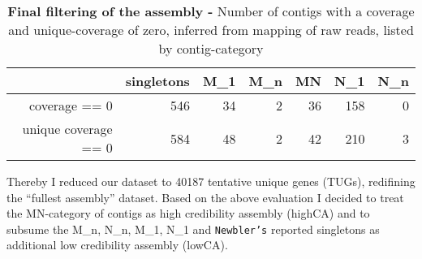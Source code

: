 \begin{table}[ht]
\begin{center}
\begin{tabular}{rrrrrrr}
  \hline
 & singletons & M\_1 & M\_n & MN & N\_1 & N\_n \\ 
  \hline
coverage == 0 & 546 &  34 &   2 &  36 & 158 &   0 \\ 
  unique coverage == 0 & 584 &  48 &   2 &  42 & 210 &   3 \\ 
   \hline
\end{tabular}
\caption[finalizing the assembly]{\textbf{Final filtering of the
    assembly -} Number of contigs with a coverage and unique-coverage
  of zero, inferred from mapping of raw reads, listed by
  contig-category}
\label{tab:cov.ex}
\end{center}
\end{table}

Thereby I reduced our dataset to 40187 tentative unique genes (TUGs),
redifining the ``fullest assembly'' dataset. Based on the above
evaluation I decided to treat the MN-category of contigs as high
credibility assembly (highCA) and to subsume the M\_n, N\_n, M\_1,
N\_1 and \texttt{Newbler's} reported singletons as additional low
credibility assembly (lowCA).

